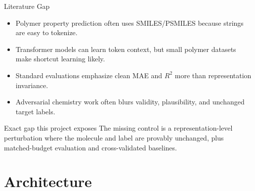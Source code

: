 \documentclass[aspectratio=169,10pt]{beamer}
\begin{document}
\begin{frame}{Literature Gap}
\begin{itemize}
  \item Polymer property prediction often uses SMILES/PSMILES because strings are easy to tokenize.
  \item Transformer models can learn token context, but small polymer datasets make shortcut learning likely.
  \item Standard evaluations emphasize clean MAE and $R^2$ more than representation invariance.
  \item Adversarial chemistry work often blurs validity, plausibility, and unchanged target labels.
\end{itemize}

\vspace{0.8em}
\begin{block}{Exact gap this project exposes}
The missing control is a representation-level perturbation where the molecule and label are provably unchanged, plus matched-budget evaluation and cross-validated baselines.
\end{block}
\end{frame}

\section{Architecture}
\end{document}
